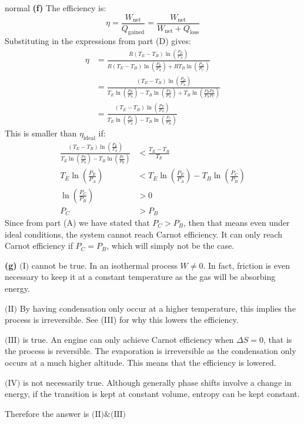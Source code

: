 \begin{solution}{normal}
\noindent \textbf{(f)} The efficiency is:
$$\eta = \frac{W_\text{net}}{Q_\text{gained}} = \frac{W_\text{net}}{W_\text{net}+Q_\text{loss}}$$
Substituting in the expressions from part (D) gives: 
\begin{align*}
\eta &= \frac{R(T_E-T_B)\ln\left(\frac{P_E}{P_A}\right)}{R(T_E-T_B)\ln\left(\frac{P_E}{P_A}\right)+RT_B\ln\left(\frac{P_D}{P_C}\right)} \\
&= \frac{(T_E-T_B)\ln\left(\frac{P_E}{P_A}\right)}{T_E\ln\left(\frac{P_E}{P_A}\right)-T_B\ln\left(\frac{P_E}{P_A}\right)+T_B\ln\left(\frac{P_BP_E}{P_AP_C}\right)} \\
&= \frac{(T_E-T_B)\ln\left(\frac{P_E}{P_A}\right)}{T_E\ln\left(\frac{P_E}{P_A}\right)-T_B\ln\left(\frac{P_C}{P_B}\right)}
\end{align*}
This is smaller than $\eta_\text{ideal}$ if:
\begin{align*}
\frac{(T_E-T_B)\ln\left(\frac{P_E}{P_A}\right)}{T_E\ln\left(\frac{P_E}{P_A}\right)-T_B\ln\left(\frac{P_C}{P_B}\right)} &< \frac{T_E-T_B}{T_E} \\
T_E\ln\left(\frac{P_E}{P_A}\right) &< T_E\ln\left(\frac{P_E}{P_A}\right)-T_B\ln\left(\frac{P_C}{P_B}\right)\\
\ln\left(\frac{P_C}{P_B}\right) &> 0 \\
P_C &> P_B
\end{align*}
Since from part (A) we have stated that $P_C>P_B$, then that means even under ideal conditions, the system cannot reach Carnot efficiency. It can only reach Carnot efficiency if $P_C=P_B$, which will simply not be the case.
\vspace{3mm}

\noindent \textbf{(g)} $\text{(I)}$ cannot be true. In an isothermal process $W \neq 0$. In fact, friction is even necessary to keep it at a constant temperature as the gas will be absorbing energy.
\vspace{2mm}

\noindent $\text{(II)}$ By having condensation only occur at a higher temperature, this implies the process is irreversible. See (III) for why this lowers the efficiency.
\vspace{2mm}

\noindent $\text{(III)}$ is true. An engine can only achieve Carnot efficiency when $\Delta S=0$, that is the process is reversible. The evaporation is irreversible as the condensation only occurs at a much higher altitude. This means that the efficiency is lowered.
\vspace{2mm}

\noindent $\text{(IV)}$ is not necessarily true. Although generally phase shifts involve a change in energy, if the transition is kept at constant volume, entropy can be kept constant.
\vspace{2mm}

\noindent Therefore the answer is $\boxed{\text{(II)} \& \text{(III)}}$ 

\end{solution}
